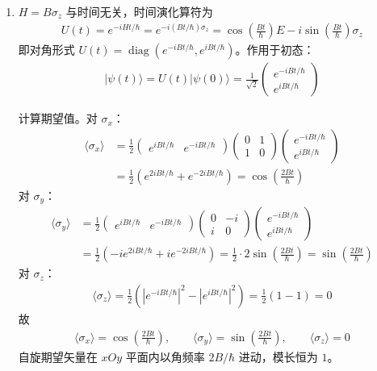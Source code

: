 \begin{enumerate}
{\begin{enumerate}
		\item $H=B\sigma_z$ 与时间无关，时间演化算符为
		\begin{align*}
			U(t)=e^{-iHt/\hbar}=e^{-i(Bt/\hbar)\sigma_z}=\cos\!\left(\frac{Bt}{\hbar}\right)E-i\sin\!\left(\frac{Bt}{\hbar}\right)\sigma_z
		\end{align*}
		即对角形式 $U(t)=\operatorname{diag}(e^{-iBt/\hbar},e^{iBt/\hbar})$。作用于初态：
		\begin{align*}
			|\psi(t)\rangle=U(t)|\psi(0)\rangle=\frac{1}{\sqrt{2}}\begin{pmatrix}e^{-iBt/\hbar}\\e^{iBt/\hbar}\end{pmatrix}
		\end{align*}

		计算期望值。对 $\sigma_x$：
		\begin{align*}
			\langle\sigma_x\rangle&=\frac{1}{2}\begin{pmatrix}e^{iBt/\hbar}&e^{-iBt/\hbar}\end{pmatrix}\begin{pmatrix}0&1\\1&0\end{pmatrix}\begin{pmatrix}e^{-iBt/\hbar}\\e^{iBt/\hbar}\end{pmatrix}\\
			&=\frac{1}{2}(e^{2iBt/\hbar}+e^{-2iBt/\hbar})=\cos\!\left(\frac{2Bt}{\hbar}\right)
		\end{align*}
		对 $\sigma_y$：
		\begin{align*}
			\langle\sigma_y\rangle&=\frac{1}{2}\begin{pmatrix}e^{iBt/\hbar}&e^{-iBt/\hbar}\end{pmatrix}\begin{pmatrix}0&-i\\i&0\end{pmatrix}\begin{pmatrix}e^{-iBt/\hbar}\\e^{iBt/\hbar}\end{pmatrix}\\
			&=\frac{1}{2}(-ie^{2iBt/\hbar}+ie^{-2iBt/\hbar})=\frac{1}{2}\cdot 2\sin\!\left(\frac{2Bt}{\hbar}\right)=\sin\!\left(\frac{2Bt}{\hbar}\right)
		\end{align*}
		对 $\sigma_z$：
		\begin{align*}
			\langle\sigma_z\rangle=\frac{1}{2}(|e^{-iBt/\hbar}|^2-|e^{iBt/\hbar}|^2)=\frac{1}{2}(1-1)=0
		\end{align*}
		故
		\begin{align*}
			\langle\sigma_x\rangle=\cos\!\left(\frac{2Bt}{\hbar}\right),\qquad \langle\sigma_y\rangle=\sin\!\left(\frac{2Bt}{\hbar}\right),\qquad \langle\sigma_z\rangle=0
		\end{align*}
		自旋期望矢量在 $xOy$ 平面内以角频率 $2B/\hbar$ 进动，模长恒为 $1$。
	\end{enumerate}
	}


\end{enumerate}
